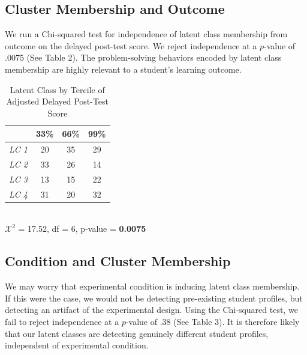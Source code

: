 \documentclass{edm_template}
\begin{document}
\subsection{Cluster Membership and Outcome}
We run a Chi-squared test for independence of latent class membership from outcome on the delayed post-test score. We reject independence at a $p$-value of .0075 (See Table 2). The problem-solving behaviors encoded by latent class membership are highly relevant to a student's learning outcome.
\begin{table}[hbtp]
\caption{Latent Class by Tercile of Adjusted Delayed Post-Test Score}
 \begin{center}
\begin{tabular}{|l || c | c | c |}
\hline
&33\%&66\%&99\%\\ \hline \hline
  \emph{LC 1}  &   20& 35& 29 \\ \hline
  \emph{LC 2}&   33& 26& 14 \\ \hline
\emph{LC 3}& 13& 15& 22 \\ \hline
  \emph{LC 4} & 31& 20& 32 \\ \hline
 \end{tabular}
\\$\mathcal{X}^2$ = 17.52, df = 6, p-value = {\bf 0.0075}
\end{center}
\label{default}
\end{table}

\subsection{Condition and Cluster Membership}

We may worry that experimental condition is inducing latent class membership. If this were the case, we would not be detecting pre-existing student profiles, but detecting an artifact of the experimental design. Using the Chi-squared test, we fail to reject independence at a $p$-value of $.38$ (See Table 3). It is therefore likely that our latent classes are detecting genuinely different student profiles, independent of experimental condition. 
\end{document}
